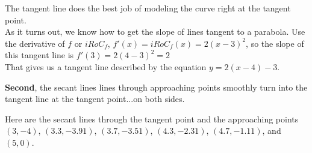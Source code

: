 \documentclass{ximera}
\begin{document}
\begin{image}
\end{image}



The tangent line does the best job of modeling the curve right at the tangent point. \\


As it turns out, we know how to get the slope of lines tangent to a parabola.  Use the derivative of $f$ or $iRoC_f$,  $f'(x)=iRoC_f(x) = 2 (x-3)^2$, so the slope of this tangent line is $f'(3) = 2 (4-3)^2 = 2$ \\

That gives us a tangent line described by the equation $y = 2 (x - 4) - 3$.











\textbf{Second}, the secant lines lines through approaching points smoothly turn into the tangent line at the tangent point...on both sides.


Here are the secant lines through the tangent point and the approaching points $(3, -4)$, $(3.3, -3.91)$, $(3.7, -3.51)$, $(4.3, -2.31)$, $(4.7, -1.11)$, and $(5, 0)$.
\end{document}
